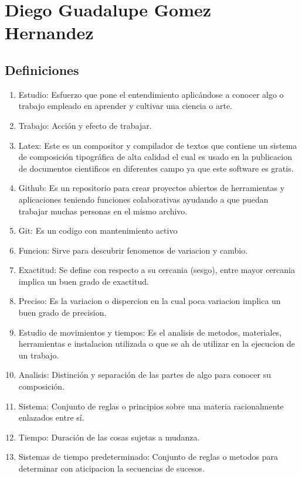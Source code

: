 \section{Diego Guadalupe Gomez Hernandez}
\subsection{Definiciones}
\begin{enumerate}
    \item Estudio: Esfuerzo que pone el entendimiento aplicándose a conocer algo o   trabajo empleado en aprender y cultivar una ciencia o arte.
    \item Trabajo: Acción y efecto de trabajar.
    \item Latex: Este es un compositor y compilador de textos que contiene un sistema de composición tipográfica de alta calidad el cual es usado en la publicacion de documentos cientificos en diferentes campo ya que este software es gratis.
    \cite{brys2019tesis}
    \item Github: Es un repositorio  para crear proyectos abiertos de herramientas y aplicaciones teniendo funciones colaborativas ayudando a que puedan trabajar muchas personas en el mismo archivo. 
    \cite{yúbalfernández_2019}
    \item Git: Es un codigo con mantenimiento activo
    \cite{astigarraga2022se}
    \item Funcion: Sirve para descubrir fenomenos de variacion y cambio.
    \item Exactitud: Se define con respecto a su cercania (sesgo), entre mayor cercania implica un buen grado de exactitud.  
    \item Preciso: Es la variacion o dispercion en la cual poca variacion implica un buen grado de precision.
    \item Estudio de movimientos y tiempos: Es el analisis de metodos, materiales, herramientas e instalacion utilizada o que se ah de utilizar en la ejecucion de un trabajo.
    \item Analisis: Distinción y separación de las partes de algo para conocer su composición.
    \cite{RAE2023}
    \item Sistema: Conjunto de reglas o principios sobre una materia racionalmente enlazados entre sí.
    \cite{asale_rae_2023}
    \item Tiempo: Duración de las cosas sujetas a mudanza.
    \item Sistemas de tiempo predeterminado: Conjunto de reglas o metodos para determinar con aticipacion la secuencias de sucesos.

\end{enumerate}

